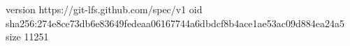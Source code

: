 version https://git-lfs.github.com/spec/v1
oid sha256:274e8ce73db6e83649fedeaa06167744a6dbdcf8b4ace1ae53ac09d884ea24a5
size 11251
